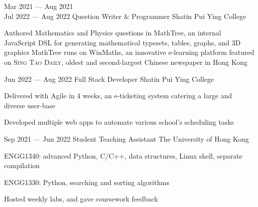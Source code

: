 \cvEntry
{Mar 2021 --- Aug 2021\\Jul 2022 --- Aug 2022 }
{Question Writer \& Programmer}
{Shatin Pui Ying College}
{
\begin{descitemize}
    \specialitem Authored Mathematics and Physics questions in MathTree, an internal JavaScript DSL for generating mathematical typesets, tables, graphs, and 3D graphics
    \specialitem MathTree runs on WinMaths, an innovative e-learning platform featured on {\scshape Sing Tao Daily}, oldest and second-largest Chinese newspaper in Hong Kong
\end{descitemize}
}

\cvEntry
{Jun 2022 --- Aug 2022}
{Full Stack Developer}
{Shatin Pui Ying College}
{
\begin{descitemize}
    \item Delivered with Agile in 4 weeks, an e-ticketing system catering a large and diverse user-base
    \item Developed multiple web apps to automate various school's scheduling tasks
\end{descitemize}
}

\cvEntry
{Sep 2021 --- Jun 2022}
{Student Teaching Assistant}
{The University of Hong Kong}
{
\begin{descitemize}
    \item ENGG1340: advanced Python, C/C++, data structures, Linux shell, separate compilation
    \item ENGG1330: Python, searching and sorting algorithms
    \item Hosted weekly labs, and gave coursework feedback
\end{descitemize}
}
